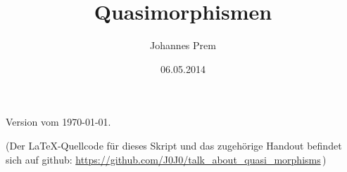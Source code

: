 
\subject{Seminar: Beschränke Kohomologie}
\title{Quasimorphismen}
\author{Johannes Prem}
\date{06.05.2014}

\maketitle
\thispagestyle{empty}

\vfill
\begin{center}\footnotesize%
    Version vom \today.
    
    \medskip
    (Der \LaTeX-Quellcode für dieses Skript und das zugehörige Handout befindet
    sich auf github: 
    \url{https://github.com/J0J0/talk_about_quasi_morphisms}\,)
\end{center}
\newpage
